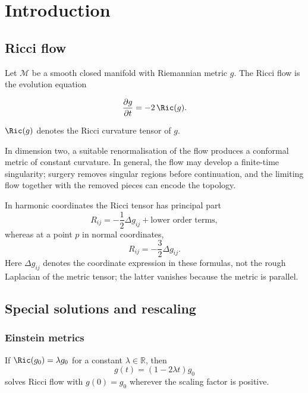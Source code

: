 \chapter{Introduction}

\section{Ricci flow}

Let $\mathcal M$ be a smooth closed manifold with Riemannian metric $g$. The
Ricci flow is the evolution equation

\begin{definition}
\label{topping-intro-ricci-flow-evolution}
\[
\frac{\partial g}{\partial t}=-2\,\Ric(g).
\]
\end{definition}

\begin{remark}
\label{topping-intro-ricci-curvature}
$\Ric(g)$ denotes the Ricci curvature tensor of $g$.
\end{remark}

In dimension two, a suitable renormalisation of the flow produces a conformal
metric of constant curvature. In general, the flow may develop a finite-time
singularity; surgery removes singular regions before continuation, and the
limiting flow together with the removed pieces can encode the topology.

In harmonic coordinates the Ricci tensor has principal part
\[
R_{ij}=-\frac12\Delta g_{ij}+\text{lower order terms},
\]
whereas at a point $p$ in normal coordinates,
\[
R_{ij}=-\frac32\Delta g_{ij}.
\]
Here $\Delta g_{ij}$ denotes the coordinate expression in these formulas, not
the rough Laplacian of the metric tensor; the latter vanishes because the
metric is parallel.

\section{Special solutions and rescaling}

\subsection{Einstein metrics}

\begin{remark}
\label{topping-intro-einstein-flow}
If $\Ric(g_0)=\lambda g_0$ for a constant $\lambda\in\mathbb R$, then
\[
g(t)=(1-2\lambda t)g_0
\]
solves Ricci flow with $g(0)=g_0$ wherever the scaling factor is positive.
\end{remark}

